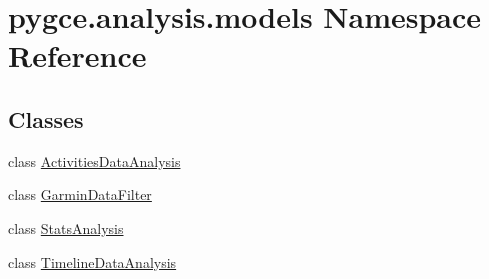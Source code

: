 \hypertarget{namespacepygce_1_1analysis_1_1models}{}\section{pygce.\+analysis.\+models Namespace Reference}
\label{namespacepygce_1_1analysis_1_1models}
\subsection*{Classes}
\begin{DoxyCompactItemize}
\item 
class \hyperlink{classpygce_1_1analysis_1_1models_1_1_activities_data_analysis}{Activities\+Data\+Analysis}
\item 
class \hyperlink{classpygce_1_1analysis_1_1models_1_1_garmin_data_filter}{Garmin\+Data\+Filter}
\item 
class \hyperlink{classpygce_1_1analysis_1_1models_1_1_stats_analysis}{Stats\+Analysis}
\item 
class \hyperlink{classpygce_1_1analysis_1_1models_1_1_timeline_data_analysis}{Timeline\+Data\+Analysis}
\end{DoxyCompactItemize}
